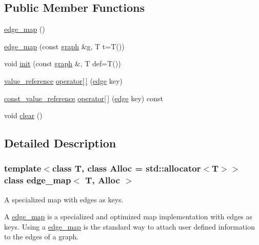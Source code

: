 \subsection*{Public Member Functions}
\begin{DoxyCompactItemize}
\item 
\mbox{\hyperlink{classedge__map_a947fa280ba03fd11b1813d484572e6df}{edge\+\_\+map}} ()
\item 
\mbox{\hyperlink{classedge__map_a30bd07fe13081b22071b721f66bb6796}{edge\+\_\+map}} (const \mbox{\hyperlink{classgraph}{graph}} \&\mbox{\hyperlink{rings_8cpp_aa9df5aa3976a89a96a5f1c7611d42938}{g}}, T t=T())
\item 
void \mbox{\hyperlink{classne__map_a4ef2ab4aebcb57a7a101975bf6a88e24}{init}} (const \mbox{\hyperlink{classgraph}{graph}} \&, T def=T())
\item 
\mbox{\hyperlink{classne__map_a3de60750d102f8992a215b0fe645014d}{value\+\_\+reference}} \mbox{\hyperlink{classne__map_a4bcfa7ec2dcbfaa42fab93dfa81e8ab0}{operator\mbox{[}$\,$\mbox{]}}} (\mbox{\hyperlink{classedge}{edge}} key)
\item 
\mbox{\hyperlink{classne__map_ad2be1a01de53940aee1282ec0e34f0f7}{const\+\_\+value\+\_\+reference}} \mbox{\hyperlink{classne__map_ad8d23cc924963ddff8267e625dcbffc6}{operator\mbox{[}$\,$\mbox{]}}} (\mbox{\hyperlink{classedge}{edge}} key) const
\item 
void \mbox{\hyperlink{classne__map_aebe555c23769c6dcc869b5ac7fae6a9c}{clear}} ()
\end{DoxyCompactItemize}


\subsection{Detailed Description}
\subsubsection*{template$<$class T, class Alloc = std\+::allocator$<$\+T$>$$>$\newline
class edge\+\_\+map$<$ T, Alloc $>$}

A specialized map with edges as keys. 

A {\ttfamily \mbox{\hyperlink{classedge__map}{edge\+\_\+map}}} is a specialized and optimized map implementation with edges as keys. Using a {\ttfamily \mbox{\hyperlink{classedge__map}{edge\+\_\+map}}} is the standard way to attach user defined information to the edges of a {\ttfamily graph}.

